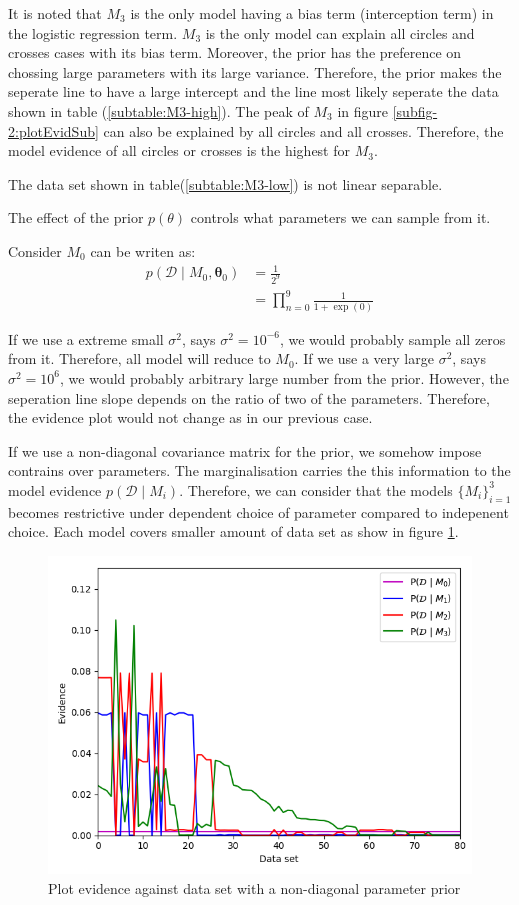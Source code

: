 \documentclass[12pt]{article}
\newenvironment{question}[2][Question]{\begin{trivlist}
\kern10pt
\item[\hskip \labelsep {\bfseries #1}\hskip \labelsep {\bfseries #2.}]}{\end{trivlist}}
\begin{document}
\begin{question}{23}
It is noted that $M_3$ is the only model having a bias term (interception term)
in the logistic regression term. 
$M_3$ is the only model can explain all circles and crosses
cases with its bias term. Moreover, the prior has the preference on chossing large
parameters with its large variance. Therefore, the prior makes the seperate line 
to have a large intercept and the line most likely seperate the data shown in table 
(\ref{subtable:M3-high}).
The peak of $M_3$ in 
figure \ref{subfig-2:plotEvidSub} can also be explained by all circles and all crosses. 
Therefore, the model evidence of all circles or crosses is the highest for $M_3$.

The data set shown in table(\ref{subtable:M3-low}) is not linear separable.
\end{question}

\begin{question}{24}
The effect of the prior $p(\theta)$ controls what parameters we can sample from it.

Consider $M_0$ can be writen as:
\begin{align*}
  p(\mathcal{D} \mid M_0, \bm{\theta}_0) &= \frac{1}{2^9} \\
    &= \prod_{n=0}^{9}\frac{1}{1 + \exp(0)}
\end{align*}

If we use a extreme small $\sigma^2$, says $\sigma^2 = 10^{-6}$, we would probably
sample all zeros from it. Therefore, all model will reduce to $M_0$.
If we use a very large $\sigma^2$, says $\sigma^2 = 10^{6}$, we would probably
arbitrary large number from the prior. However, the seperation line slope depends
on the ratio of two of the parameters. Therefore, the evidence plot would not change
as in our previous case.

If we use a non-diagonal covariance matrix for the prior, we somehow impose
contrains over parameters. The marginalisation carries the this information to 
the model evidence $p(\mathcal{D}\mid M_i)$. Therefore, we can consider
that the models $\{{M_i}\}_{i=1}^3$ becomes restrictive under dependent choice 
of parameter compared to indepenent choice. Each model covers smaller amount of 
data set as show in figure \ref{fig:Q24-non-diag-plotEvid}.
\begin{figure}[h] 
  \centering
  \includegraphics[width=0.5\linewidth]{fig/Q24-non-diag.png}
  \caption{Plot evidence against data set with a non-diagonal parameter prior}
  \label{fig:Q24-non-diag-plotEvid}
\end{figure}


\end{question}
\end{document}
